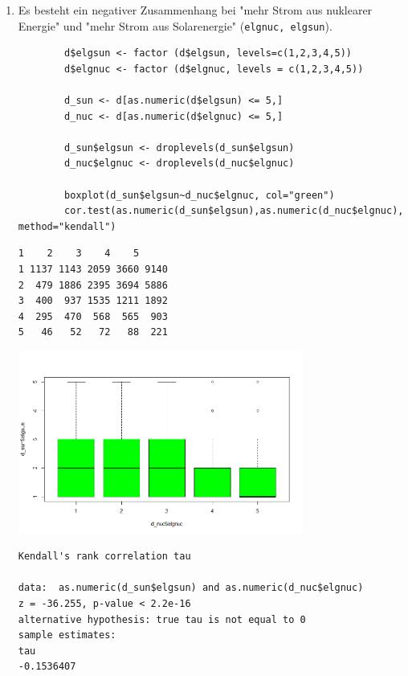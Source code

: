 \documentclass{article}
\begin{document}
\begin{enumerate}
\newpage

	\item Es besteht ein negativer Zusammenhang bei "mehr Strom aus nuklearer Energie" und "mehr Strom aus Solarenergie" (\texttt{elgnuc, elgsun}).
	\begin{lstlisting}
		d$elgsun <- factor (d$elgsun, levels=c(1,2,3,4,5))
		d$elgnuc <- factor (d$elgnuc, levels = c(1,2,3,4,5))
		
		d_sun <- d[as.numeric(d$elgsun) <= 5,]
		d_nuc <- d[as.numeric(d$elgnuc) <= 5,]
		
		d_sun$elgsun <- droplevels(d_sun$elgsun)
		d_nuc$elgnuc <- droplevels(d_nuc$elgnuc)
		
		boxplot(d_sun$elgsun~d_nuc$elgnuc, col="green")
		cor.test(as.numeric(d_sun$elgsun),as.numeric(d_nuc$elgnuc), method="kendall")
	\end{lstlisting}
\begin{minipage}{0.40\textwidth}
	\begin{Verbatim}[frame=single]
     1    2    3    4    5
1 1137 1143 2059 3660 9140
2  479 1886 2395 3694 5886
3  400  937 1535 1211 1892
4  295  470  568  565  903
5   46   52   72   88  221
	\end{Verbatim}
\end{minipage}
\begin{minipage}{0.45\textwidth}
	\includegraphics[height=6cm]{./Hypothese2a.png}
\end{minipage}
\begin{Verbatim}[frame=single]
	Kendall's rank correlation tau

data:  as.numeric(d_sun$elgsun) and as.numeric(d_nuc$elgnuc)
z = -36.255, p-value < 2.2e-16
alternative hypothesis: true tau is not equal to 0
sample estimates:
tau 
-0.1536407 
\end{Verbatim}
	

\newpage


\end{enumerate}
\end{document}
